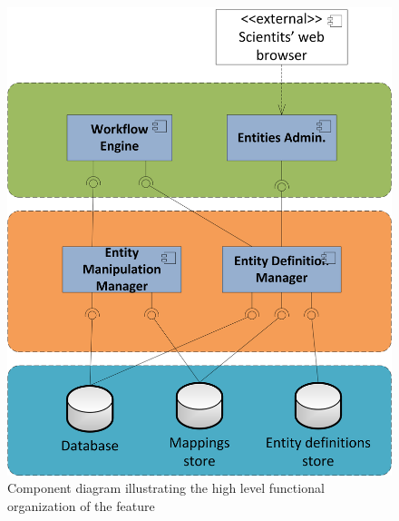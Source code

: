 \begin{figure}[h!]
  \centering
  	\includegraphics[scale=0.6]{storage/functional/func_main.png}
  \caption{Component diagram illustrating the high level functional organization of the feature }
  \label{fig:storageFuncMain}
\end{figure}

